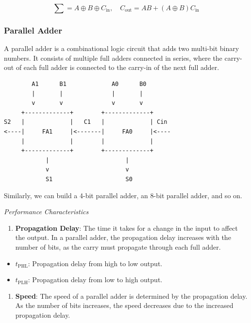 \documentclass[11pt,a4paper]{article}
\providecommand{\tightlist}{\setlength{\itemsep}{1pt}\setlength{\parskip}{0pt}}
\begin{document}
\[ \sum = A \oplus B \oplus C_{\text{in}} , \quad C_{\text{out}} = AB + (A \oplus B)C_{\text{in}} \]

\subsubsection{Parallel Adder}\label{parallel-adder}

A parallel adder is a combinational logic circuit that adds two
multi-bit binary numbers. It consists of multiple full adders connected
in series, where the carry-out of each full adder is connected to the
carry-in of the next full adder.

\begin{verbatim}
        A1      B1             A0      B0
        |       |              |       |
        v       v              v       v
     +-------------+        +-------------+
S2   |             |   C1   |             | Cin
<----|     FA1     |<-------|     FA0     |<----
     |             |        |             |
     +-------------+        +-------------+
            |                      |
            v                      v
            S1                     S0
\end{verbatim}

Similarly, we can build a 4-bit parallel adder, an 8-bit parallel adder,
and so on.

\emph{Performance Characteristics}

\begin{enumerate}
\def\labelenumi{\arabic{enumi}.}
\tightlist
\item
  \textbf{Propagation Delay}: The time it takes for a change in the
  input to affect the output. In a parallel adder, the propagation delay
  increases with the number of bits, as the carry must propagate through
  each full adder.
\end{enumerate}

\begin{itemize}
\tightlist
\item
  \(t_{\text{PHL}}\): Propagation delay from high to low output.
\item
  \(t_{\text{PLH}}\): Propagation delay from low to high output.
\end{itemize}

\begin{enumerate}
\def\labelenumi{\arabic{enumi}.}
\setcounter{enumi}{1}
\tightlist
\item
  \textbf{Speed}: The speed of a parallel adder is determined by the
  propagation delay. As the number of bits increases, the speed
  decreases due to the increased propagation delay.
\end{enumerate}
\end{document}
